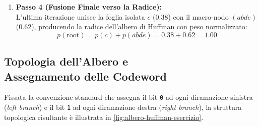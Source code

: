 \begin{enumerate}
  \item \textbf{Passo 4 (Fusione Finale verso la Radice):}\\
  L'ultima iterazione unisce la foglia isolata $c$ ($0.38$) con il macro-nodo $(abde)$ ($0.62$), producendo la radice dell'albero di Huffman con peso normalizzato:
  \begin{equation}
    p(\text{root}) = p(c) + p(abde) = 0.38 + 0.62 = 1.00
  \end{equation}
\end{enumerate}

\FloatBarrier
\subsection[Topologia dell'Albero e Assegnamento Codeword]{Topologia dell'Albero e\\Assegnamento delle Codeword}
\label{subsec:ex-topologia-albero-huffman}

Fissata la convenzione standard che assegna il bit \texttt{0} ad ogni diramazione sinistra (\textit{left branch}) e il bit \texttt{1} ad ogni diramazione destra (\textit{right branch}), la struttura topologica risultante \`e illustrata in \autoref{fig:albero-huffman-esercizio}.

